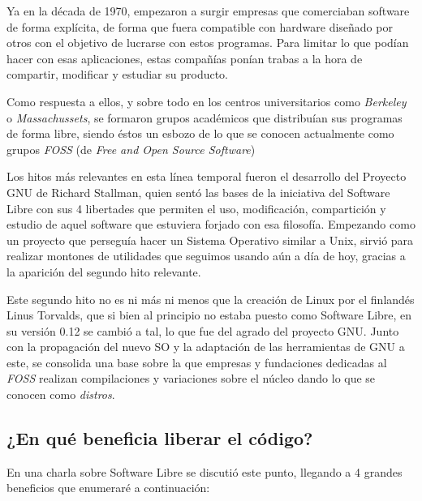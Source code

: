 Ya en la década de 1970, empezaron a surgir empresas que comerciaban software de forma explícita, de forma que fuera compatible con hardware diseñado por otros con el objetivo de lucrarse con estos programas. Para limitar lo que podían hacer con esas aplicaciones, estas compañías ponían trabas a la hora de compartir, modificar y estudiar su producto.

Como respuesta a ellos, y sobre todo en los centros universitarios como \textit{Berkeley} o \textit{Massachussets}, se formaron grupos académicos que distribuían sus programas de forma libre, siendo éstos un esbozo de lo que se conocen actualmente como grupos \textit{FOSS} (de \textit{Free and Open Source Software}) 

Los hitos más relevantes en esta línea temporal fueron el desarrollo del Proyecto GNU de Richard Stallman, quien  sentó las bases de la iniciativa del Software Libre con sus 4 libertades que permiten el uso, modificación, compartición y estudio de aquel software que estuviera forjado con esa filosofía. Empezando como un proyecto que perseguía hacer un Sistema Operativo similar a Unix, sirvió para realizar montones de utilidades que seguimos usando aún a día de hoy, gracias a la aparición del segundo hito relevante.

Este segundo hito no es ni más ni menos que la creación de Linux por el finlandés Linus Torvalds, que si bien al principio no estaba puesto como Software Libre, en su versión 0.12 se cambió a tal, lo que fue del agrado del proyecto GNU. Junto con la propagación del nuevo SO y la adaptación de las herramientas de GNU a este, se consolida una base sobre la que empresas y fundaciones dedicadas al \textit{FOSS} realizan compilaciones y variaciones sobre el núcleo dando lo que se conocen como \textit{distros}.

\subsection{¿En qué beneficia liberar el código?}
En una charla sobre Software Libre se discutió este punto, llegando a 4 grandes beneficios que enumeraré a continuación:

